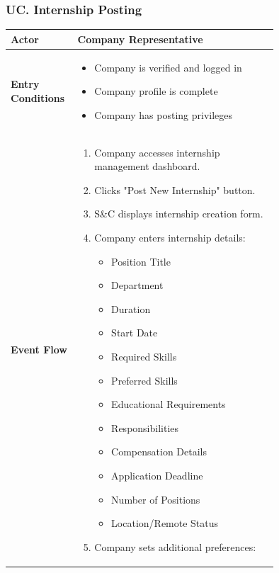 \subsubsection*{UC\cuc . Internship Posting}
\begin{center}
    \begin{longtable}{|l|p{0.75\linewidth}|}
        \hline
        \textbf{Actor}            & Company Representative \\
        \hline
        \textbf{Entry Conditions} & 
        \begin{itemize}
            \item Company is verified and logged in
            \item Company profile is complete
            \item Company has posting privileges
        \end{itemize} \\
        \hline
        \textbf{Event Flow}       & 
        \begin{enumerate}
            \item Company accesses internship management dashboard.
            \item Clicks "Post New Internship" button.
            \item S\&C displays internship creation form.
            \item Company enters internship details:
            \begin{itemize}
                \item Position Title
                \item Department
                \item Duration
                \item Start Date
                \item Required Skills
                \item Preferred Skills
                \item Educational Requirements
                \item Responsibilities
                \item Compensation Details
                \item Application Deadline
                \item Number of Positions
                \item Location/Remote Status
            \end{itemize}
            \item Company sets additional preferences:

\end{enumerate}
\end{longtable}
\end{center}
